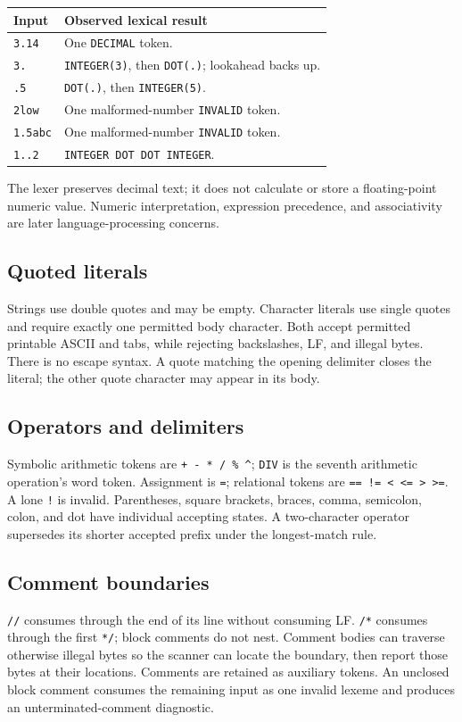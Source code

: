 \documentclass[11pt,a4paper]{article}
\newcommand{\code}[1]{\texttt{#1}}
\begin{document}
\begin{tabularx}{\linewidth}{@{}p{30mm}Y@{}}
\toprule Input & Observed lexical result \\\midrule
\code{3.14} & One \code{DECIMAL} token. \\
\code{3.} & \code{INTEGER(3)}, then \code{DOT(.)}; lookahead backs up. \\
\code{.5} & \code{DOT(.)}, then \code{INTEGER(5)}. \\
\code{2low} & One malformed-number \code{INVALID} token. \\
\code{1.5abc} & One malformed-number \code{INVALID} token. \\
\code{1..2} & \code{INTEGER DOT DOT INTEGER}. \\\bottomrule
\end{tabularx}

The lexer preserves decimal text; it does not calculate or store a floating-point
numeric value. Numeric interpretation, expression precedence, and associativity
are later language-processing concerns.

\subsection{Quoted literals}
Strings use double quotes and may be empty. Character literals use single
quotes and require exactly one permitted body character. Both accept permitted
printable ASCII and tabs, while rejecting backslashes, LF, and illegal bytes.
There is no escape syntax. A quote matching the opening delimiter closes the
literal; the other quote character may appear in its body.

\subsection{Operators and delimiters}
Symbolic arithmetic tokens are \code{+ - * / \% \^{}}; \code{DIV} is the seventh
arithmetic operation's word token. Assignment is \code{=}; relational tokens
are \code{== != < <= > >=}. A lone \code{!} is invalid. Parentheses, square
brackets, braces, comma, semicolon, colon, and dot have individual accepting
states. A two-character operator supersedes its shorter accepted prefix under
the longest-match rule.

\subsection{Comment boundaries}
\code{//} consumes through the end of its line without consuming LF.
\code{/*} consumes through the first \code{*/}; block comments do not nest.
Comment bodies can traverse otherwise illegal bytes so the scanner can locate
the boundary, then report those bytes at their locations. Comments are retained
as auxiliary tokens. An unclosed block comment consumes the remaining input
as one invalid lexeme and produces an unterminated-comment diagnostic.
\end{document}
